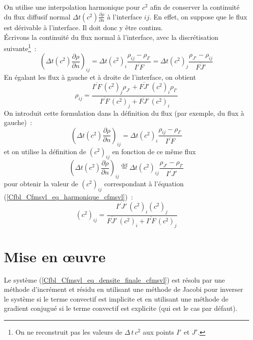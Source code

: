 On utilise une interpolation harmonique pour $c^2$
afin de conserver la continuit\'e du flux diffusif normal
$\Delta t (c^2) \displaystyle\frac{\partial \rho}{\partial n}$
\`a l'interface $ij$. En effet, on suppose que le flux est d\'erivable \`a
l'interface. Il doit donc y \^etre continu.\\
%
\'Ecrivons la continuit\'e du flux normal \`a l'interface,
avec la discr\'etisation
suivante\footnote{On ne reconstruit pas les valeurs de $\Delta\,t\,c^2$
aux points $I'$ et
$J'$.}~:
\begin{equation}
\left(\Delta t (c^2)\displaystyle\frac{\partial \rho}{\partial n}\right)_{ij}
= \Delta t (c^2)_i  \displaystyle\frac{\rho_{ij} - \rho_{I'}   }{\overline{I'F}}
=  \Delta t (c^2)_j  \displaystyle\frac{\rho_{J'}    - \rho_{ij}}{\overline{FJ'}}
\end{equation}
En \'egalant les flux \`a gauche et \`a droite de l'interface, on obtient
\begin{equation}
\rho_{ij} = \displaystyle\frac{\overline{I'F}\,(c^2)_j\rho_{J'} + \overline{FJ'}\,(c^2)_i\rho_{I'}}
{\overline{I'F}\,(c^2)_j + \overline{FJ'}\,(c^2)_i}
\end{equation}
On introduit cette formulation dans la d\'efinition du flux (par exemple, du
flux \`a gauche)~:
\begin{equation}
\left(\Delta t (c^2)\displaystyle\frac{\partial \rho}{\partial n}\right)_{ij}
= \Delta t (c^2)_i  \displaystyle\frac{\rho_{ij} - \rho_{I'}   }{\overline{I'F}}
\end{equation}
et on utilise la d\'efinition de $(c^2)_{ij}$ en fonction de ce m\^eme flux
\begin{equation}
\left(\Delta t (c^2)\displaystyle\frac{\partial \rho}{\partial n}\right)_{ij}
 \stackrel{\text{d\'ef}}{=}
 \Delta t (c^2)_{ij} \displaystyle\frac{\rho_{J'}    - \rho_{I'}   }{\overline{I'J'}}
\end{equation}
pour obtenir la valeur de $(c^2)_{ij}$ correspondant \`a l'\'equation (\ref{Cfbl_Cfmsvl_eq_harmonique_cfmsvl})~:
\begin{equation}
(c^2)_{ij} = \displaystyle\frac{\overline{I'J'}\,(c^2)_i(c^2)_j}{\overline{FJ'}\,(c^2)_i + \overline{I'F}\,(c^2)_j}
\end{equation}

\section*{Mise en \oe uvre}
Le syst\`eme (\ref{Cfbl_Cfmsvl_eq_densite_finale_cfmsvl}) est r\'esolu par une m\'ethode
d'incr\'ement et r\'esidu en utilisant
une m\'ethode de Jacobi pour inverser le syst\`eme si le terme convectif
est implicite et en utilisant une m\'ethode de gradient conjugu\'e
si le terme convectif est explicite (qui est le cas par défaut).

